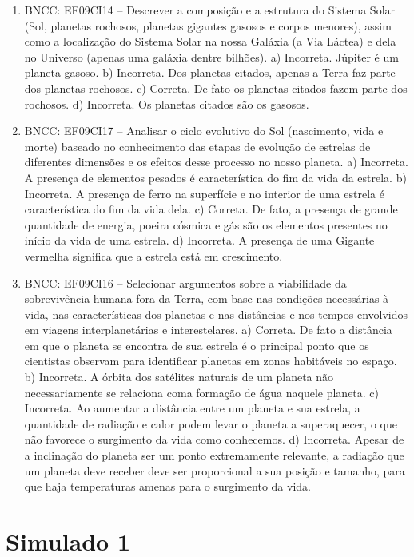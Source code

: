\begin{enumerate}
\item
BNCC: EF09CI14 -- Descrever a composição e a estrutura
do Sistema Solar (Sol, planetas rochosos, planetas gigantes gasosos e
corpos menores), assim como a localização do Sistema Solar na nossa
Galáxia (a Via Láctea) e dela no Universo (apenas uma galáxia dentre
bilhões).
a) Incorreta. Júpiter é um planeta gasoso.
b) Incorreta. Dos planetas citados, apenas a Terra faz parte dos planetas rochosos.
c) Correta. De fato os planetas citados fazem parte dos rochosos.
d) Incorreta. Os planetas citados são os gasosos.

\item
BNCC: EF09CI17 -- Analisar o ciclo evolutivo do Sol (nascimento, vida e morte) baseado no conhecimento das etapas de evolução de estrelas de diferentes dimensões e os efeitos desse processo
no nosso planeta.
a) Incorreta. A presença de elementos pesados é
  característica do fim da vida da estrela.
b) Incorreta. A presença de ferro na superfície e no interior de uma
  estrela é característica do fim da vida dela.
c) Correta. De fato, a presença de grande quantidade de energia,
  poeira cósmica e gás são os elementos presentes no início da vida de uma estrela.
d) Incorreta. A presença de uma Gigante vermelha significa que a estrela está em crescimento.

\item
BNCC: EF09CI16 -- Selecionar argumentos sobre a
viabilidade da sobrevivência humana fora da Terra, com base nas
condições necessárias à vida, nas características dos planetas e nas
distâncias e nos tempos envolvidos em viagens interplanetárias e interestelares.
a) Correta. De fato a distância em que o planeta se encontra de sua
  estrela é o principal ponto que os cientistas observam para
  identificar planetas em zonas habitáveis no espaço.
b) Incorreta. A órbita dos satélites naturais de um planeta não
  necessariamente se relaciona coma formação de água naquele planeta.
c) Incorreta. Ao aumentar a distância entre um planeta e sua estrela,
  a quantidade de radiação e calor podem levar o planeta a superaquecer, o que não favorece o surgimento da vida como conhecemos.
d) Incorreta. Apesar de a inclinação do planeta ser um ponto
  extremamente relevante, a radiação que um planeta deve receber deve
  ser proporcional a sua posição e tamanho, para que haja temperaturas amenas para o surgimento da vida.
\end{enumerate}

\section*{Simulado 1}

